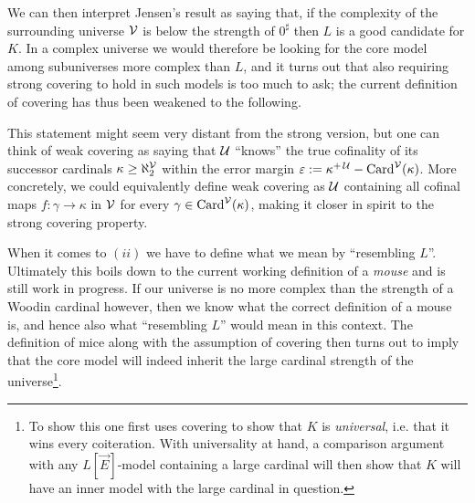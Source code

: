 \documentclass[../../main]{subfiles}
\begin{document}

We can then interpret Jensen's result as saying that, if the complexity of the surrounding universe $\operatorname{\mathcal V}$ is below the strength of $0^\sharp$ then $L$ is a good candidate for $K$. In a complex universe we would therefore be looking for the core model among subuniverses more complex than $L$, and it turns out that also requiring strong covering to hold in such models is too much to ask; the current definition of covering has thus been weakened to the following.


This statement might seem very distant from the strong version, but one can think of weak covering as saying that $\operatorname{\mathcal U}$ ``knows'' the true cofinality of its successor cardinals $\kappa\geq\aleph_2^{\operatorname{\mathcal V}}$ within the error margin $\varepsilon:=\kappa^{+\operatorname{\mathcal U}}-\operatorname{Card}^{\operatorname{\mathcal V}}(\kappa)$. More concretely, we could equivalently define weak covering as $\operatorname{\mathcal U}$ containing all cofinal maps $f\colon\gamma\to\kappa$ in $\operatorname{\mathcal V}$ for every $\gamma\in\operatorname{Card}^{\operatorname{\mathcal V}}(\kappa)$, making it closer in spirit to the strong covering property.


\qquad When it comes to $(ii)$ we have to define what we mean by ``resembling $L$''. Ultimately this boils down to the current working definition of a \textit{mouse} and is still work in progress. If our universe is no more complex than the strength of a Woodin cardinal however, then we know what the correct definition of a mouse is, and hence also what ``resembling $L$'' would mean in this context. The definition of mice along with the assumption of covering then turns out to imply that the core model will indeed inherit the large cardinal strength of the universe\footnote{To show this one first uses covering to show that $K$ is \textit{universal}, i.e. that it wins every coiteration. With universality at hand, a comparison argument with any $L[\vec E]$-model containing a large cardinal will then show that $K$ will have an inner model with the large cardinal in question.}.
\end{document}
